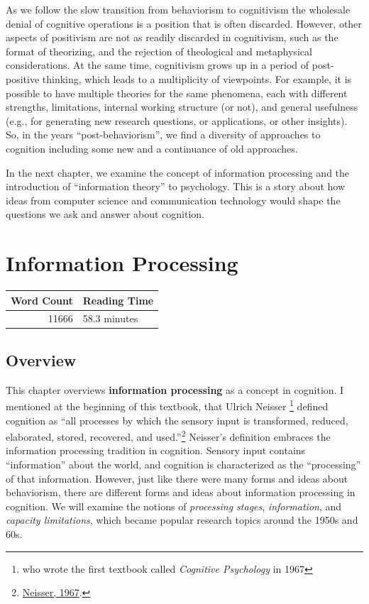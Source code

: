 \documentclass[
  oneside,
  12pt]{crumpbook}
\begin{document}
As we follow the slow transition from behaviorism to cognitivism the wholesale denial of cognitive operations is a position that is often discarded. However, other aspects of positivism are not as readily discarded in cognitivism, such as the format of theorizing, and the rejection of theological and metaphysical considerations. At the same time, cognitivism grows up in a period of post-positive thinking, which leads to a multiplicity of viewpoints. For example, it is possible to have multiple theories for the same phenomena, each with different strengths, limitations, internal working structure (or not), and general usefulness (e.g., for generating new research questions, or applications, or other insights). So, in the years ``post-behaviorism'', we find a diversity of approaches to cognition including some new and a continuance of old approaches.

In the next chapter, we examine the concept of information processing and the introduction of ``information theory'' to psychology. This is a story about how ideas from computer science and communication technology would shape the questions we ask and answer about cognition.

\hypertarget{information-processing}{%
\chapter{Information Processing}\label{information-processing}}

\begin{tabular}{r|l}
\hline
Word Count & Reading Time\\
\hline
11666 & 58.3 minutes\\
\hline
\end{tabular}

\hypertarget{overview-1}{%
\section{Overview}\label{overview-1}}

This chapter overviews \textbf{information processing} as a concept in cognition. I mentioned at the beginning of this textbook, that Ulrich Neisser \footnote{who wrote the first textbook called \emph{Cognitive Psychology} in 1967} defined cognition as ``all processes by which the sensory input is transformed, reduced, elaborated, stored, recovered, and used.''\footnote{\protect\hyperlink{ref-neisserCognitivePsychology1967}{Neisser, 1967}.} Neisser's definition embraces the information processing tradition in cognition. Sensory input contains ``information'' about the world, and cognition is characterized as the ``processing'' of that information. However, just like there were many forms and ideas about behaviorism, there are different forms and ideas about information processing in cognition. We will examine the notions of \emph{processing stages}, \emph{information}, and \emph{capacity limitations}, which became popular research topics around the 1950s and 60s.
\end{document}
